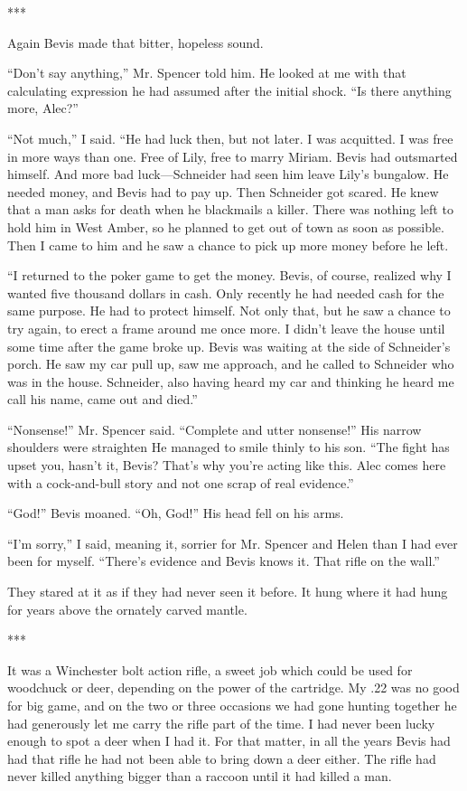 {***

Again Bevis made that bitter, hopeless sound.

“Don’t say anything,” Mr. Spencer told him. He looked at me with that calculating expression he had assumed after the initial shock. “Is there anything more, Alec?”

“Not much,” I said. “He had luck then, but not later. I was acquitted. I was free in more ways than one. Free of Lily, free to marry Miriam. Bevis had outsmarted himself. And more bad luck—Schneider had seen him leave Lily’s bungalow. He needed money, and Bevis had to pay up. Then Schneider got scared. He knew that a man asks for death when he blackmails a killer. There was nothing left to hold him in West Amber, so he planned to get out of town as soon as possible. Then I came to him and he saw a chance to pick up more money before he left.

“I returned to the poker game to get the money. Bevis, of course, realized why I wanted five thousand dollars in cash. Only recently he had needed cash for the same purpose. He had to protect himself. Not only that, but he saw a chance to try again, to erect a frame around me once more. I didn’t leave the house until some time after the game broke up. Bevis was waiting at the side of Schneider’s porch. He saw my car pull up, saw me approach, and he called to Schneider who was in the house. Schneider, also having heard my car and thinking he heard me call his name, came out and died.”

“Nonsense!” Mr. Spencer said. “Complete and utter nonsense!” His narrow shoulders were straighten He managed to smile thinly to his son. “The fight has upset you, hasn’t it, Bevis? That’s why you’re acting like this. Alec comes here with a cock-and-bull story and not one scrap of real evidence.”

“God!” Bevis moaned. “Oh, God!” His head fell on his arms.

“I’m sorry,” I said, meaning it, sorrier for Mr. Spencer and Helen than I had ever been for myself. “There’s evidence and Bevis knows it. That rifle on the wall.”

They stared at it as if they had never seen it before. It hung where it had hung for years above the ornately carved mantle.

***

It was a Winchester bolt action rifle, a sweet job which could be used for woodchuck or deer, depending on the power of the cartridge. My .22 was no good for big game, and on the two or three occasions we had gone hunting together he had generously let me carry the rifle part of the time. I had never been lucky enough to spot a deer when I had it. For that matter, in all the years Bevis had had that rifle he had not been able to bring down a deer either. The rifle had never killed anything bigger than a raccoon until it had killed a man.

}
